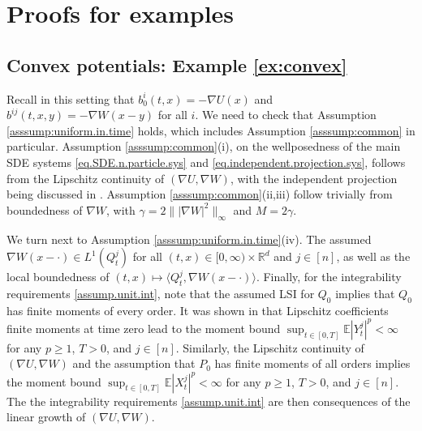 \documentclass[11pt,reqno]{amsart}
\numberwithin{equation}{section}
\theoremstyle{definition}
\def\E{{\mathbb E}}
\def\R{{\mathbb R}}
\begin{document}
\appendix





\section{Proofs for examples}
\subsection{Convex potentials: Example \ref{ex:convex}} \label{se:proofs:convexpotentials}
Recall in this setting that $ b_0^{i}(t,x) = -\nabla U(x) $ and $ b^{ij}(t,x,y) = - \nabla W(x - y) $ for all $i$. 
We need to check that Assumption \ref{asssump:uniform.in.time} holds, which includes Assumption \ref{asssump:common} in particular.
Assumption \ref{asssump:common}(i), on the wellposedness of the main SDE systems \eqref{eq.SDE.n.particle.sys} and \eqref{eq.independent.projection.sys}, follows from the Lipschitz continuity of $(\nabla U, \nabla W)$, with the independent projection being discussed in \cite[Proposition 4.1]{lacker2023independent}. Assumption \ref{asssump:common}(ii,iii) follow trivially from boundedness of $\nabla W$, with $\gamma = 2\||\nabla W|^2\|_\infty$ and $M =2\gamma$.

We turn next to Assumption \ref{asssump:uniform.in.time}(iv).
The assumed  $\nabla W(x - \cdot) \in L^1(Q^j_t)$ for all $(t,x) \in [0, \infty) \times \R^d$ and $j \in [n]$, as well as the local boundedness of $(t,x) \mapsto \langle Q^j_t, \nabla W(x-\cdot)\rangle$. Finally, for the integrability requirements \eqref{assump.unit.int}, note that the assumed LSI for $Q_0$ implies that $Q_0$ has finite moments of every order. It was shown in \cite[Proposition 4.1]{lacker2023independent} that Lipschitz coefficients finite moments at time zero lead to the moment bound $\sup_{t \in [0,T]}\E|Y^j_t|^p< \infty$ for any $p \ge 1$, $T> 0$, and $j \in [n]$. Similarly, the Lipschitz continuity of $ (\nabla U, \nabla W) $ and the assumption that $ P_0 $ has finite moments of all orders implies the moment bound $\sup_{t \in [0,T]}\E|X^j_t|^p< \infty$ for any $p \ge 1$, $T> 0$, and $j \in [n]$. The the integrability requirements \eqref{assump.unit.int} are then consequences of the linear growth of $ (\nabla U, \nabla W) $.  
\end{document}
